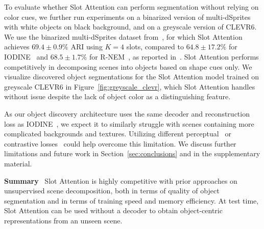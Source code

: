 \documentclass{article}
\begin{document}
To evaluate whether Slot Attention can perform segmentation without relying on color cues, we further run experiments on a binarized version of multi-dSprites with white objects on black background, and on a greyscale version of CLEVR6. We use the binarized multi-dSprites dataset from~\citet{multiobjectdatasets19}, for which Slot Attention achieves $69.4 \pm 0.9\%$ ARI using $K=4$ slots, compared to $64.8 \pm 17.2\%$ for IODINE~\citep{greff2019multi} and $68.5 \pm 1.7\%$ for R-NEM~\citep{van2018relational}, as reported in~\citep{greff2019multi}. Slot Attention performs competitively in decomposing scenes into objects based on shape cues only.
We visualize discovered object segmentations for the Slot Attention model trained on greyscale CLEVR6 in Figure~\ref{fig:greyscale_clevr}, which Slot Attention handles without issue despite the lack of object color as a distinguishing feature.

As our object discovery architecture uses the same decoder and reconstruction loss as IODINE~\citep{greff2019multi}, we expect it to similarly struggle with scenes containing more complicated backgrounds and textures. Utilizing different perceptual~\citep{goodfellow2014generative,yang2020learning} or contrastive losses~\citep{kipf2019contrastive} could help overcome this limitation. We discuss further limitations and future work in Section~\ref{sec:conclusions} and in the supplementary material.

\textbf{Summary} \ Slot Attention is highly competitive with prior approaches on unsupervised scene decomposition, both in terms of quality of object segmentation and in terms of training speed and memory efficiency. At test time, Slot Attention can be used without a decoder to obtain object-centric representations from an unseen scene.
\end{document}
